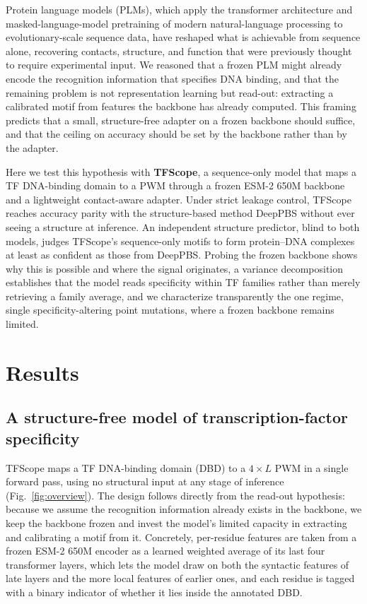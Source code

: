 \documentclass[11pt]{article}
\begin{document}
Protein language models (PLMs), which apply the transformer architecture and
masked-language-model pretraining of modern natural-language
processing\cite{vaswani2017attention,devlin2019bert} to evolutionary-scale sequence
data, have reshaped what is achievable from sequence alone, recovering contacts,
structure, and function that were previously thought to require experimental
input\cite{rives2021esm1b,elnaggar2021prottrans,rao2021msa,rao2019evaluating,lin2023esm2}. We reasoned that a frozen PLM might already
encode the recognition information that specifies DNA binding, and that the
remaining problem is not representation learning but read-out: extracting a
calibrated motif from features the backbone has already computed. This framing
predicts that a small, structure-free adapter on a frozen backbone should suffice,
and that the ceiling on accuracy should be set by the backbone rather than by the
adapter.

Here we test this hypothesis with \textbf{TFScope}, a sequence-only model that maps
a TF DNA-binding domain to a PWM through a frozen ESM-2 650M backbone and a
lightweight contact-aware adapter. Under strict leakage control, TFScope reaches
accuracy parity with the structure-based method DeepPBS without ever seeing a
structure at inference. An independent structure predictor, blind to both models,
judges TFScope's sequence-only motifs to form protein--DNA complexes at least as
confident as those from DeepPBS. Probing the frozen backbone shows why this is
possible and where the signal originates, a variance decomposition establishes that
the model reads specificity within TF families rather than merely retrieving a
family average, and we characterize transparently the one regime, single
specificity-altering point mutations, where a frozen backbone remains limited.

\section*{Results}

\subsection*{A structure-free model of transcription-factor specificity}

TFScope maps a TF DNA-binding domain (DBD) to a $4\times L$ PWM in a single forward
pass, using no structural input at any stage of inference (Fig.~\ref{fig:overview}).
The design follows directly from the read-out hypothesis: because we assume the
recognition information already exists in the backbone, we keep the backbone frozen
and invest the model's limited capacity in extracting and calibrating a motif from
it. Concretely, per-residue features are taken from a frozen ESM-2 650M
encoder\cite{lin2023esm2} as a learned weighted average of its last four
transformer layers, which lets the model draw on both the syntactic features of
late layers and the more local features of earlier ones, and each residue is tagged
with a binary indicator of whether it lies inside the annotated DBD.
\end{document}

